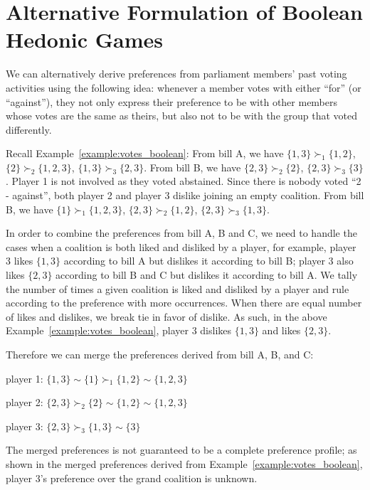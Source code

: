 
\chapter{Alternative Formulation of Boolean Hedonic Games}
\label{append:alternative_boolean}

We can alternatively derive preferences from parliament members' past voting
activities using the following idea:
whenever a member votes with either ``for'' (or ``against''), they not only
express their preference to be with other members whose votes are the same
as theirs, but also not to be with the group that voted differently.

Recall Example~\ref{example:votes_boolean}:
From bill A, we have $\{1, 3\} \succ_1 \{1, 2\}$, $\{2\} \succ_2 \{1, 2, 3\}$,
$\{1, 3\} \succ_3 \{2, 3\}$.
From bill B, we have $\{2, 3\} \succ_2 \{2\}$, $\{2, 3\} \succ_3 \{3\}$.
Player 1 is not involved as they voted abstained.
Since there is nobody voted ``2 - against'', both player 2 and player 3 dislike
joining an empty coalition.
From bill B, we have $\{1\} \succ_1 \{1, 2, 3\}$, $\{2, 3\} \succ_2 \{1, 2\}$,
$\{2, 3\} \succ_3 \{1, 3\}$.

In order to combine the preferences from bill A, B and C, we need to handle
the cases when a coalition is both liked and disliked by a player, for example,
player 3 likes $\{1, 3\}$ according to bill A but dislikes it according to bill B;
player 3 also likes $\{2, 3\}$ according to bill B and C but dislikes it
according to bill A.
We tally the number of times a given coalition is liked and disliked by a
player and rule according to the preference with more occurrences.
When there are equal number of likes and dislikes, we break tie in favor of dislike.
As such, in the above Example~\ref{example:votes_boolean}, player 3 dislikes
$\{1, 3\}$ and likes $\{2, 3\}$.

Therefore we can merge the preferences derived from bill A, B, and C:

player 1: $\{1, 3\} \sim \{1\} \succ_1 \{1, 2\} \sim \{1, 2, 3\}$

player 2: $\{2, 3\} \succ_2 \{2\} \sim \{1, 2\} \sim \{1, 2, 3\}$

player 3: $\{2, 3\} \succ_3 \{1, 3\} \sim \{3\}$

The merged preferences is not guaranteed to be a complete preference profile;
as shown in the merged preferences derived from Example~\ref{example:votes_boolean},
player 3's preference over the grand coalition is unknown.

